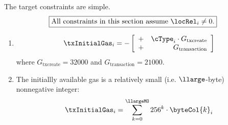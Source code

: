 The target constraints are simple.
\[
	\boxed{\text{All constraints in this section assume }\locRel_{i} \neq 0.}
\]
\begin{enumerate}
	\item
	\[
		\txInitialGas_{i}
		=
		-
		\left[
			\begin{array}{cr}
				+ & \cType_{i} \cdot G_{\text{txcreate}} \\
				+ & G_{\text{transaction}}\\
			\end{array}
		\right]
	\]
	where $G_{\text{txcreate}} = 32000$ and $G_{\text{transaction}} = 21000$.
	\item The initiallly available gas is a relatively small (i.e. $\llarge$-byte) nonnegative integer:
	\[
		\txInitialGas_{i}
		=
		\sum_{k = 0}^{\llargeMO} 256^k \cdot \byteCol{k}_{i}
	\]
\end{enumerate}
